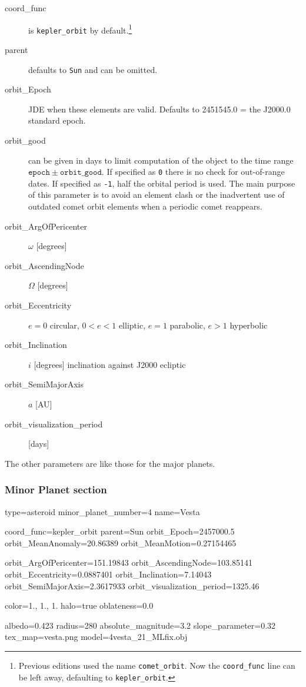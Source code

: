 \begin{description}
\item[coord\_func] is \texttt{kepler\_orbit} by
  default.\footnote{Previous editions used the name
    \texttt{comet\_orbit}. Now the \texttt{coord\_func} line can be
    left away, defaulting to \texttt{kepler\_orbit}.}
\item[parent] defaults to \texttt{Sun} and can be omitted.

\item[orbit\_Epoch] JDE when these elements are valid. Defaults to
  2451545.0 = the J2000.0 standard epoch.

\item[orbit\_good] can be given in days to limit computation of the
  object to the time range
  $\mathtt{epoch}\pm\mathtt{orbit\_good}$. If
  specified as \texttt{0} there is no check for out-of-range dates. If
  specified as \texttt{-1}, half the orbital period is used. The main
  purpose of this parameter is to avoid an element clash or the
  inadvertent use of outdated comet orbit elements when a periodic
  comet reappears.

\item[orbit\_ArgOfPericenter] $\omega$ [degrees]
\item[orbit\_AscendingNode] $\Omega$  [degrees]
\item[orbit\_Eccentricity] $e=0$ circular, $0<e<1$ elliptic, $e=1$ parabolic, $e>1$ hyperbolic
\item[orbit\_Inclination] $i$ [degrees] inclination against J2000 ecliptic
\item[orbit\_SemiMajorAxis] $a$ [AU]
\item[orbit\_visualization\_period] [days] %
\end{description}
The other parameters are like those for the major planets. 

\subsubsection{Minor Planet section}
\label{sec:ssystem.ini:MinorPlanet}

\begin{configfile}
[4vesta]
type=asteroid  
minor_planet_number=4
name=Vesta

coord_func=kepler_orbit
parent=Sun
orbit_Epoch=2457000.5
orbit_MeanAnomaly=20.86389
orbit_MeanMotion=0.27154465

orbit_ArgOfPericenter=151.19843
orbit_AscendingNode=103.85141
orbit_Eccentricity=0.0887401
orbit_Inclination=7.14043
orbit_SemiMajorAxis=2.3617933
orbit_visualization_period=1325.46

color=1., 1., 1.
halo=true
oblateness=0.0

albedo=0.423
radius=280
absolute_magnitude=3.2
slope_parameter=0.32
tex_map=vesta.png
model=4vesta_21_MLfix.obj
\end{configfile}

